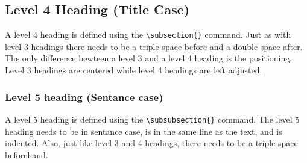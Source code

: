 \subsection{Level 4 Heading (Title Case)}

A level 4 heading is defined using the \verb|\subsection{}| command. Just as with level 3 headings there needs to be a triple space before and a double space after. The only difference bewteen a level 3 and a level 4 heading is the positioning. Level 3 headings are centered while level 4 headings are left adjusted.

\subsubsection{Level 5 heading (Sentance case)}

A level 5 heading is defined using the \verb|\subsubsection{}| command. The level 5 heading needs to be in sentance case, is in the same line as the text, and is indented. Also, just like level 3 and 4 headings, there needs to be a triple space beforehand.


